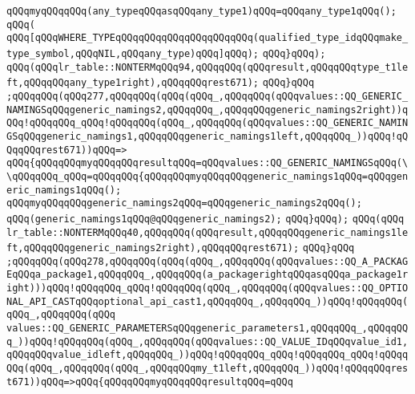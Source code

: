 \verb|qQQqmyqQQqqQQq(any_typeqQQqasqQQqany_type1)qQQq=qQQqany_type1qQQq();|\newline
\verb|qQQq(|\newline
\verb|qQQq[qQQqWHERE_TYPEqQQqqQQqqQQqqQQqqQQqqQQq(qualified_type_idqQQqmake_type_symbol,qQQqNIL,qQQqany_type)qQQq]qQQq);|\newline
\verb|qQQq}qQQq);|\newline
\verb|qQQq(qQQqlr_table::NONTERMqQQq94,qQQqqQQq(qQQqresult,qQQqqQQqtype_t1left,qQQqqQQqany_type1right),qQQqqQQqrest671);|\newline
\verb|qQQq}qQQq|\newline
\verb|;qQQqqQQq(qQQq277,qQQqqQQq(qQQq(qQQq_,qQQqqQQq(qQQqvalues::QQ_GENERIC_NAMINGSqQQqgeneric_namings2,qQQqqQQq_,qQQqqQQqgeneric_namings2right))qQQq!qQQqqQQq_qQQq!qQQqqQQq(qQQq_,qQQqqQQq(qQQqvalues::QQ_GENERIC_NAMINGSqQQqgeneric_namings1,qQQqqQQqgeneric_namings1left,qQQqqQQq_))qQQq!qQQqqQQqrest671))qQQq=>|\newline
\verb|qQQq{qQQqqQQqmyqQQqqQQqresultqQQq=qQQqvalues::QQ_GENERIC_NAMINGSqQQq(\\qQQqqQQq_qQQq=qQQqqQQq{qQQqqQQqmyqQQqqQQqgeneric_namings1qQQq=qQQqgeneric_namings1qQQq();|\newline
\verb|qQQqmyqQQqqQQqgeneric_namings2qQQq=qQQqgeneric_namings2qQQq();|\newline
\verb|qQQq(generic_namings1qQQq@qQQqgeneric_namings2);|\newline
\verb|qQQq}qQQq);|\newline
\verb|qQQq(qQQq|\newline
\verb|lr_table::NONTERMqQQq40,qQQqqQQq(qQQqresult,qQQqqQQqgeneric_namings1left,qQQqqQQqgeneric_namings2right),qQQqqQQqrest671);|\newline
\verb|qQQq}qQQq|\newline
\verb|;qQQqqQQq(qQQq278,qQQqqQQq(qQQq(qQQq_,qQQqqQQq(qQQqvalues::QQ_A_PACKAGEqQQqa_package1,qQQqqQQq_,qQQqqQQq(a_packagerightqQQqasqQQqa_package1right)))qQQq!qQQqqQQq_qQQq!qQQqqQQq(qQQq_,qQQqqQQq(qQQqvalues::QQ_OPTIONAL_API_CASTqQQqoptional_api_cast1,qQQqqQQq_,qQQqqQQq_))qQQq!qQQqqQQq(qQQq_,qQQqqQQq(qQQq|\newline
\verb|values::QQ_GENERIC_PARAMETERSqQQqgeneric_parameters1,qQQqqQQq_,qQQqqQQq_))qQQq!qQQqqQQq(qQQq_,qQQqqQQq(qQQqvalues::QQ_VALUE_IDqQQqvalue_id1,qQQqqQQqvalue_idleft,qQQqqQQq_))qQQq!qQQqqQQq_qQQq!qQQqqQQq_qQQq!qQQqqQQq(qQQq_,qQQqqQQq(qQQq_,qQQqqQQqmy_t1left,qQQqqQQq_))qQQq!qQQqqQQqrest671))qQQq=>qQQq{qQQqqQQqmyqQQqqQQqresultqQQq=qQQq|\newline
